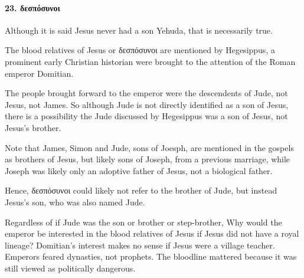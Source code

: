 \paragraph{23.
δεσπόσυνοι}\label{par:par:ux3b4ux3b5ux3c3ux3c0ux3ccux3c3ux3c5ux3bdux3bfux3b9}

Although it is said Jesus never had a son Yehuda, that is necessarily true.

The blood relatives of Jesus or δεσπόσυνοι are mentioned by Hegesippus, a prominent early Christian historian were brought to the attention of the Roman emperor Domitian.

The people brought forward to the emperor were the descendents of Jude, not Jesus, not James.
So although Jude is not directly identified as a son of Jesus, there is a possibility the Jude discussed by Hegesippus was a son of Jesus, not Jesus's brother.

Note that James, Simon and Jude, sons of Joesph, are mentioned in the gospels as brothers of Jesus, but likely sons of Joseph, from a previous marriage, while Joseph was likely only an adoptive father of Jesus, not a biological father.

Hence, δεσπόσυνοι could likely not refer to the brother of Jude, but instead Jesus's son, who was also named Jude.

Regardless of if Jude was the son or brother or step-brother, Why would the emperor be interested in the blood relatives of Jesus if Jesus did not have a royal lineage?
Domitian’s interest makes no sense if Jesus were a village teacher.
Emperors feared dynasties, not prophets.
The bloodline mattered because it was still viewed as politically dangerous.
